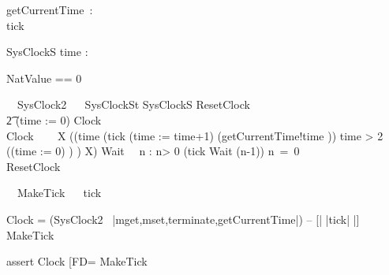 
\begin{circus}
  \circchannel getCurrentTime~:~\nat\\
  \circchannel tick
\end{circus}

\begin{schema}{SysClockS}
 time : \nat
\end{schema}
\begin{zed}
NatValue == 0 
\end{zed}
\begin{circus}%
  \circprocess\ ~SysClock2 ~\circdef~\circbegin
  \circstate SysClockSt  SysClockS
  ResetClock ~\circdef~
  \\\t2  (time := 0) \circseq Clock\\
  Clock ~\circdef~ 
  \circmu~X \circspot 
    ((\circif time  \circthen (tick \then (time := time+1) \interleave (getCurrentTime!time \then \Skip))
        \circelse time > 2 \circthen ((time := 0) \circseq \Skip) 
        \circfi) \circseq X)
  Wait~\circdef~ \circvar n : \nat \circspot
   \circif n> 0 \circthen (tick \then Wait (n-1))
   \circelse n~=~0 \circthen \Skip
   \circfi\\
  \circspot ResetClock
  \circend
\end{circus}
\begin{circus}
\circprocess\ ~MakeTick ~\circdef~\circbegin
\circspot tick \then \Skip
\circend
\end{circus}

Clock = 
  (SysClock2 \ {|mget,mset,terminate,getCurrentTime|}) 
  -- [| {|tick|} |] MakeTick 

assert Clock [FD= MakeTick
